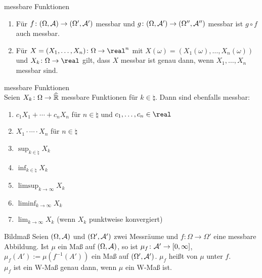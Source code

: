 \linie

\begin{Satz}{messbare Funktionen}
    \begin{enumerate}
        \item
        Für $f\colon (\Omega, \mathcal{A}) \rightarrow (\Omega', \mathcal{A}')$ messbar und
        $g\colon (\Omega, \mathcal{A}') \rightarrow (\Omega'', \mathcal{A}'')$ messbar ist
        $g \circ f$ auch messbar.

        \item
        Für $X = (X_1, \dotsc, X_n)\colon \Omega \rightarrow \real^n$ mit
        $X(\omega) = (X_1(\omega), \dotsc, X_n(\omega))$ und $X_k\colon \Omega \rightarrow \real$
        gilt, dass $X$ messbar ist genau dann, wenn $X_1, \dotsc, X_n$ messbar sind.
    \end{enumerate}
\end{Satz}

\begin{Satz}{messbare Funktionen}\\
    Seien $X_k\colon \Omega \rightarrow \widehat{\mathbb{R}}$ messbare Funktionen für $k \in \natural$.
    Dann sind ebenfalls messbar:
    \begin{enumerate}
        \item
        $c_1 X_1 + \dotsb + c_n X_n$ für $n \in \natural$ und $c_1, \dotsc, c_n \in \real$

        \item
        $X_1 \cdot \dotsm \cdot X_n$ für $n \in \natural$

        \item
        $\sup_{k \in \natural} X_k$

        \item
        $\inf_{k \in \natural} X_k$

        \item
        $\limsup_{k \to \infty} X_k$

        \item
        $\liminf_{k \to \infty} X_k$

        \item
        $\lim_{k \to \infty} X_k$ (wenn $X_k$ punktweise konvergiert)
    \end{enumerate}
\end{Satz}

\linie

\begin{Def}{Bildmaß}
    Seien $(\Omega, \mathcal{A})$ und $(\Omega', \mathcal{A}')$ zwei Messräume und
    $f\colon \Omega \rightarrow \Omega'$ eine messbare Abbildung.
    Ist $\mu$ ein Maß auf $(\Omega, \mathcal{A})$, so ist $\mu_f\colon \mathcal{A}' \rightarrow [0, \infty]$,
    $\mu_f(A') := \mu(f^{-1}(A'))$ ein Maß auf $(\Omega', \mathcal{A}')$.
    $\mu_f$ heißt  von $\mu$ unter $f$.\\
    $\mu_f$ ist ein W-Maß genau dann, wenn $\mu$ ein W-Maß ist.
\end{Def}


